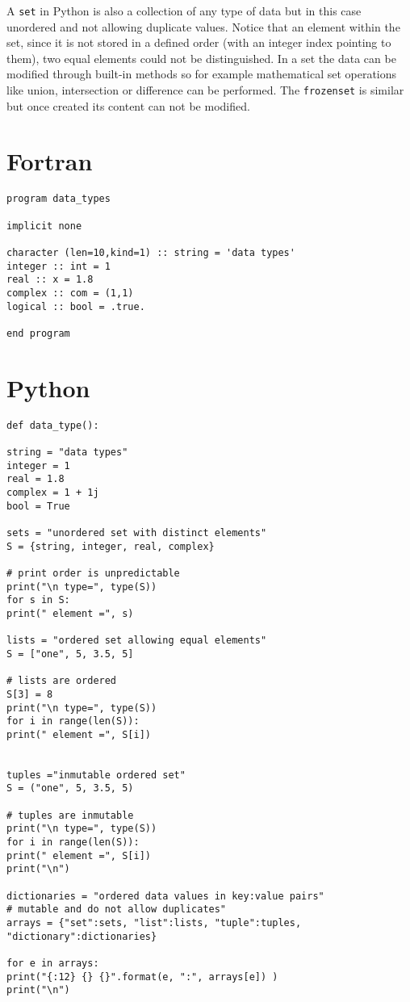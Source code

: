 A \texttt{set} in Python is also a collection of any type of data but in this case unordered and not allowing duplicate values. 
Notice that an element within the set, since it is not stored in a defined order (with an integer index pointing to them), two equal elements could not be distinguished.
In a set the data can be modified through built-in methods so for example mathematical set operations like union, intersection or difference can be performed.
The \texttt{frozenset} is similar but once created its content can not be modified. 



    \newpage  
    \section{Fortran}

\begin{verbatim}
program data_types

implicit none

character (len=10,kind=1) :: string = 'data types'
integer :: int = 1
real :: x = 1.8
complex :: com = (1,1)
logical :: bool = .true.

end program
\end{verbatim}







    \newpage
    \section{Python}

\begin{verbatim}
def data_type(): 

string = "data types"
integer = 1 
real = 1.8 
complex = 1 + 1j
bool = True

sets = "unordered set with distinct elements" 
S = {string, integer, real, complex} 

# print order is unpredictable 
print("\n type=", type(S)) 
for s in S: 
print(" element =", s)

lists = "ordered set allowing equal elements" 
S = ["one", 5, 3.5, 5] 

# lists are ordered  
S[3] = 8
print("\n type=", type(S))   
for i in range(len(S)): 
print(" element =", S[i]) 


tuples ="inmutable ordered set" 
S = ("one", 5, 3.5, 5)  

# tuples are inmutable 
print("\n type=", type(S))
for i in range(len(S)): 
print(" element =", S[i])   
print("\n")   

dictionaries = "ordered data values in key:value pairs"
# mutable and do not allow duplicates"
arrays = {"set":sets, "list":lists, "tuple":tuples, "dictionary":dictionaries} 

for e in arrays:  
print("{:12} {} {}".format(e, ":", arrays[e]) )
print("\n")
\end{verbatim}


